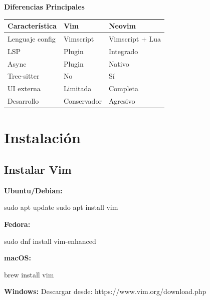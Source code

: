 \documentclass[
  doc,
  floatsintext,
  longtable,
  a4paper,
  nolmodern,
  notxfonts,
  notimes,
  12pt,
  colorlinks=true,linkcolor=blue,citecolor=blue,urlcolor=blue]{apa7}
\newenvironment{Shaded}{\begin{snugshade}}{\end{snugshade}}
\newcommand{\ExtensionTok}[1]{\textcolor[rgb]{0.00,0.23,0.31}{#1}}
\newcommand{\FunctionTok}[1]{\textcolor[rgb]{0.28,0.35,0.67}{#1}}
\newcommand{\NormalTok}[1]{\textcolor[rgb]{0.00,0.23,0.31}{#1}}
\newcounter{none} %
\begin{document}
\textbf{Diferencias Principales}

{\def\LTcaptype{none} %
\begin{longtable}[]{@{}lll@{}}
\toprule\noalign{}
Característica & Vim & Neovim \\
\midrule\noalign{}
\endhead
\bottomrule\noalign{}
\endlastfoot
Lenguaje config & Vimscript & Vimscript + Lua \\
LSP & Plugin & Integrado \\
Async & Plugin & Nativo \\
Tree-sitter & No & Sí \\
UI externa & Limitada & Completa \\
Desarrollo & Conservador & Agresivo \\
\end{longtable}
}

\section{Instalación}\label{instalaciuxf3n}

\subsection{Instalar Vim}\label{instalar-vim}

\textbf{Ubuntu/Debian:}

\begin{Shaded}
\begin{Highlighting}[]
\FunctionTok{sudo}\NormalTok{ apt update}
\FunctionTok{sudo}\NormalTok{ apt install vim}
\end{Highlighting}
\end{Shaded}

\textbf{Fedora:}

\begin{Shaded}
\begin{Highlighting}[]
\FunctionTok{sudo}\NormalTok{ dnf install vim{-}enhanced}
\end{Highlighting}
\end{Shaded}

\textbf{macOS:}

\begin{Shaded}
\begin{Highlighting}[]
\ExtensionTok{brew}\NormalTok{ install vim}
\end{Highlighting}
\end{Shaded}

\textbf{Windows:} Descargar desde: https://www.vim.org/download.php
\end{document}
